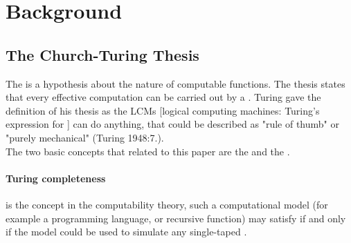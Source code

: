 \section{Background}
\subsection{The Church-Turing Thesis}
The  is a hypothesis about the nature of computable functions\cite{church_unsolvable_1936}.
The thesis states that every effective computation can be carried out by a \cite{copeland_church-turing_2002}.
Turing gave the definition of his thesis as the LCMs [logical computing machines: Turing's expression for ] can do anything, that could be described as "rule of thumb" or "purely mechanical" (Turing 1948:7.)\cite{copeland_church-turing_2002}.\\
The two basic concepts that related to this paper are the  and the .
\paragraph{Turing completeness} is the concept in the computability theory, such a computational model (for example a programming language, or recursive function) may satisfy  if and only if the model could be used to simulate any single-taped \cite{rogers_theory_1987}.
